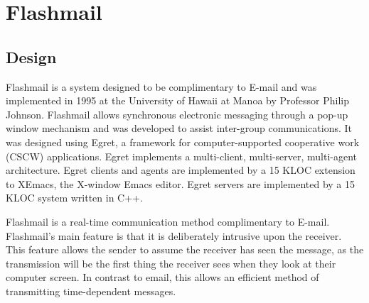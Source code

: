 \chapter{Flashmail}
\section{Design}
Flashmail is a system designed to be complimentary to E-mail and was
implemented in 1995 at the University of Hawaii at Manoa by Professor
Philip Johnson.  Flashmail allows synchronous electronic messaging through
a pop-up window mechanism and was developed to assist inter-group
communications.  It was designed using Egret, a framework for
computer-supported cooperative work (CSCW) applications. Egret implements a
multi-client, multi-server, multi-agent architecture. Egret clients and
agents are implemented by a 15 KLOC extension to XEmacs, the X-window Emacs
editor.  Egret servers are implemented by a 15 KLOC system written in C++.

Flashmail is a real-time communication method
complimentary to E-mail.  Flashmail's main feature is that it is
deliberately intrusive upon the receiver.  This feature allows the sender
to assume the receiver has seen the message, as the transmission will be
the first thing the receiver sees when they look at their computer screen.
In contrast to email, this allows an efficient method of transmitting
time-dependent messages.


